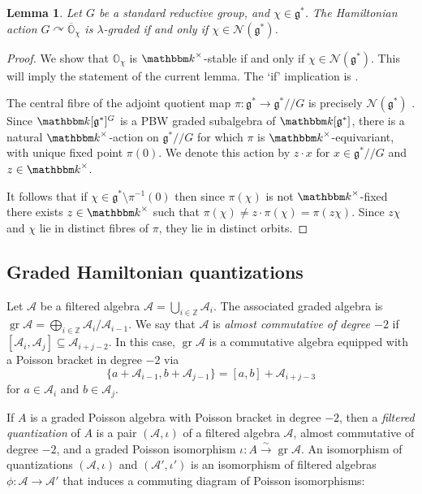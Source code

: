 \documentclass[twoside,12pt,reqno]{amsart}
\newtheorem{Lemma}[Theorem]{Lemma}
\theoremstyle{remark}
\numberwithin{equation}{section}
\def\k{{\mathbbm k}}
\def\gr{\operatorname{gr}}
\def\Z{{\mathbb Z}}
\def\O{{\mathbb O}}
\def\g{{\mathfrak g}}
\newcommand{\A}{\mathcal{A}}
\newcommand{\Nc}{\mathcal{N}}
\begin{document}
\begin{Lemma}\label{L:gradorbs}
Let $G$ be a standard reductive group, and $\chi \in \g^*$. The Hamiltonian action $G\curvearrowright \overline{\O}_\chi$ is $\lambda$-graded if and only if $\chi \in \Nc(\g^*)$.
\end{Lemma}
\begin{proof}
We show that $\O_\chi$ is $\k^\times$-stable if and only if $\chi \in \Nc(\g^*)$. This will imply the statement of the  current lemma. The `if' implication is \cite[Lemma~2.10]{JaNO}.

The central fibre of the adjoint quotient map $\pi: \g^* \to \g^*/\!\!/ G$ is precisely $\Nc(\g^*)$ \cite[\textsection{}--7]{JaNO}. Since $\k[\g^*]^G$ is a PBW graded subalgebra of $\k[\g^*]$, there is a natural $\k^\times$-action on $\g^*/\!\!/ G$ for which $\pi$ is $\k^\times$-equivariant, with unique fixed point $\pi(0)$. We denote this action by $z \cdot x$ for $x \in \g^*/\!/G$ and $z\in \k^\times$.

It follows that if $\chi\in \g^* \setminus \pi^{-1}(0)$ then since $\pi(\chi)$ is not $\k^\times$-fixed there exists $z\in \k^\times$ such that $\pi(\chi) \neq z\cdot \pi(\chi) = \pi(z\chi)$. Since $z\chi$ and $\chi$ lie in distinct fibres of $\pi$, they lie in distinct orbits.
\end{proof}




\subsection{Graded Hamiltonian quantizations}
\label{ss:gradedHamQuant}

Let $\A$ be a filtered algebra $\A = \bigcup_{i\in \Z} \A_i$. The associated graded algebra is $\gr \A = \bigoplus_{i\in \Z} \A_i / \A_{i-1}$. We say that $\A$ is {\it almost commutative of degree $-2$} if $[\A_i, \A_j] \subseteq \A_{i + j - 2}$. In this case, $\gr \A$ is a commutative algebra equipped with a Poisson bracket in degree $-2$ via
$$\{ a + \A_{i-1}, b + \A_{j-1}\} = [a,b] + \A_{i+j-3}$$
for $a\in \A_{i}$ and $b\in \A_j$.

If $A$ is a graded Poisson algebra with Poisson bracket in degree $-2$, then a {\it filtered quantization} of $A$ is a pair $(\A, \iota)$ of a filtered algebra $\A$, almost commutative of degree $-2$, and a graded Poisson isomorphism $\iota : A \xrightarrow{\sim} \gr \A$. An isomorphism of quantizations $(\A, \iota)$ and $(\A', \iota')$ is an isomorphism of filtered algebras $\phi : \A \to \A'$ that induces a commuting diagram of Poisson isomorphisms:
\begin{center}
\label{eq:quantisodiagram}
\end{center}
\end{document}
